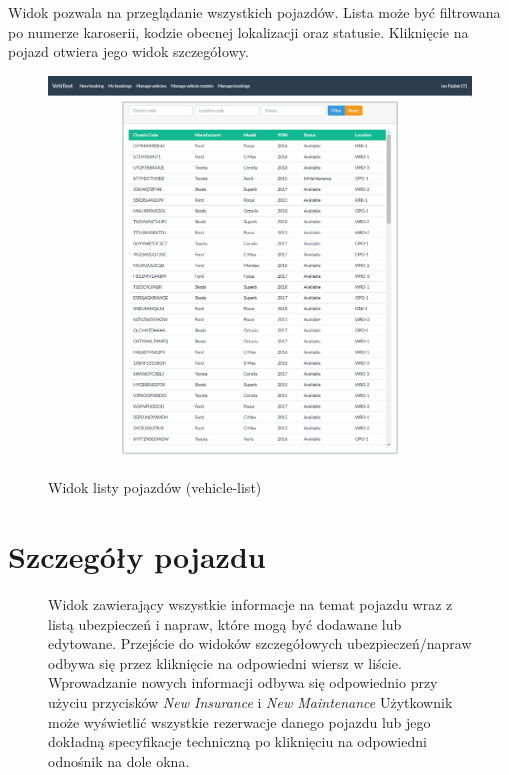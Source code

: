 \documentclass[eng,printmode,openany]{mgr}
\begin{document}
\begin{appendices}
		Widok pozwala na przeglądanie wszystkich pojazdów. Lista może być filtrowana po numerze karoserii, kodzie obecnej lokalizacji oraz statusie. Kliknięcie na pojazd otwiera jego widok szczegółowy.
		\begin{figure}[H]
			\centering
			\includegraphics[width=\textwidth]{images/views/vehicle-list.png}
			\caption{Widok listy pojazdów (vehicle-list)}
		\end{figure}
		
		\newpage
		\section{Szczegóły pojazdu}
		\begin{figure}[H]
			
			Widok zawierający wszystkie informacje na temat pojazdu wraz z listą ubezpieczeń i napraw, które mogą być dodawane lub edytowane. Przejście do widoków szczegółowych ubezpieczeń/napraw odbywa się przez kliknięcie na odpowiedni wiersz w liście. Wprowadzanie nowych informacji odbywa się odpowiednio przy użyciu przycisków \textit{New Insurance} i \textit{New Maintenance} Użytkownik może wyświetlić wszystkie rezerwacje danego pojazdu lub jego dokładną specyfikacje techniczną po kliknięciu na odpowiedni odnośnik na dole okna.
			

\end{figure}
\end{appendices}
\end{document}
